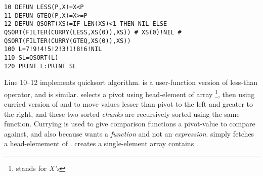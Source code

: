 \begin{lstlisting}
10 DEFUN LESS(P,X)=X<P
11 DEFUN GTEQ(P,X)=X>=P
12 DEFUN QSORT(XS)=IF LEN(XS)<1 THEN NIL ELSE QSORT(FILTER(CURRY(LESS,XS(0)),XS)) # XS(0)!NIL # QSORT(FILTER(CURRY(GTEQ,XS(0)),XS))
100 L=7!9!4!5!2!3!1!8!6!NIL
110 SL=QSORT(L)
120 PRINT L:PRINT SL
\end{lstlisting}

Line 10--12 implements quicksort algorithm.  is a user-function version of less-than operator, and  is similar.  selects a pivot using head-element of array \footnote{stands for \emph{X's}}, then using curried version of  and  to move values lesser than pivot to the left and greater to the right, and these two sorted \emph{chunks} are recursively sorted using the same  function. Currying is used to give comparison functions a pivot-value to compare against, and also because  wants a \emph{function} and not an \emph{expression}.  simply fetches a head-elemement of .  creates a single-element array contains .
